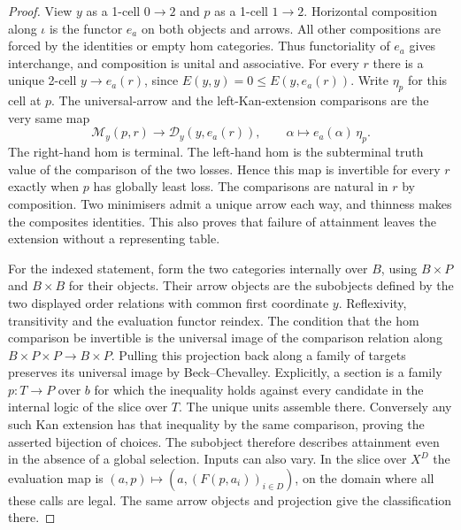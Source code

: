\documentclass[11pt,a4paper]{article}
\theoremstyle{definition}
\theoremstyle{remark}\newaliascnt{remark}{theorem}
\numberwithin{equation}{section}
\begin{document}
\begin{proof}
View \(y\) as a 1-cell \(0\to2\) and \(p\) as a 1-cell \(1\to2\). Horizontal composition along \(\iota\) is the functor \(e_a\) on both objects and arrows. All other compositions are forced by the identities or empty hom categories. Thus functoriality of \(e_a\) gives interchange, and composition is unital and associative. For every \(r\) there is a unique 2-cell \(y\to e_a(r)\), since \(E(y,y)=0\le E(y,e_a(r))\). Write \(\eta_p\) for this cell at \(p\). The universal-arrow and the left-Kan-extension comparisons are the very same map
\[
 \mathcal M_y(p,r)\longrightarrow\mathcal D_y(y,e_a(r)),\qquad
 \alpha\longmapsto e_a(\alpha)\,\eta_p .
\]
The right-hand hom is terminal. The left-hand hom is the subterminal truth value of the comparison of the two losses. Hence this map is invertible for every \(r\) exactly when \(p\) has globally least loss. The comparisons are natural in \(r\) by composition. Two minimisers admit a unique arrow each way, and thinness makes the composites identities. This also proves that failure of attainment leaves the extension without a representing table.

For the indexed statement, form the two categories internally over \(B\), using \(B\times P\) and \(B\times B\) for their objects. Their arrow objects are the subobjects defined by the two displayed order relations with common first coordinate \(y\). Reflexivity, transitivity and the evaluation functor reindex. The condition that the hom comparison be invertible is the universal image of the comparison relation along \(B\times P\times P\to B\times P\). Pulling this projection back along a family of targets preserves its universal image by Beck--Chevalley. Explicitly, a section is a family \(p:T\to P\) over \(b\) for which the inequality holds against every candidate in the internal logic of the slice over \(T\). The unique units assemble there. Conversely any such Kan extension has that inequality by the same comparison, proving the asserted bijection of choices. The subobject therefore describes attainment even in the absence of a global selection. Inputs can also vary. In the slice over \(X^D\) the evaluation map is \((a,p)\mapsto(a,(F(p,a_i))_{i\in D})\), on the domain where all these calls are legal. The same arrow objects and projection give the classification there.
\end{proof}
\end{document}
